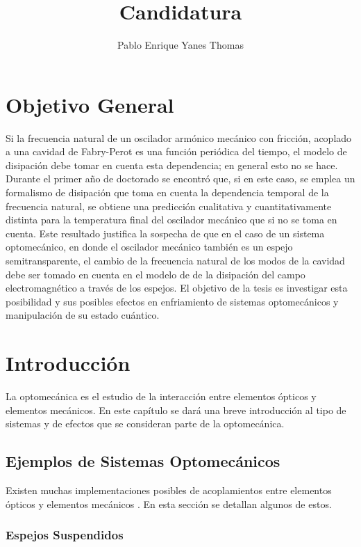 \documentclass[10pt,a4paper]{report}
\author{Pablo Enrique Yanes Thomas}
\title{Candidatura}
\begin{document}
\tableofcontents
\chapter*{Objetivo General}
Si la frecuencia natural de un oscilador armónico mecánico con
fricción, acoplado a una cavidad de Fabry-Perot  es una
función periódica del tiempo, el modelo de disipación
 debe tomar en cuenta esta dependencia; en
general esto no se hace. Durante el primer año de doctorado se
encontró que, si en este caso, se emplea un formalismo de disipación
que toma en cuenta la dependencia temporal de la frecuencia natural,
se obtiene una predicción cualitativa y cuantitativamente distinta
para la temperatura final del oscilador mecánico que si no se toma en
cuenta. Este resultado justifica la sospecha de que en el caso de un
sistema optomecánico, en donde el oscilador mecánico también es un
espejo semitransparente, el cambio de la frecuencia natural de los
modos de la cavidad debe ser tomado en cuenta en el modelo de
de la disipación del campo electromagnético a través
de los espejos. El objetivo de la tesis es investigar esta posibilidad
y sus posibles efectos en enfriamiento de sistemas optomecánicos y
manipulación de su estado cuántico.


\chapter{Introducción}

La optomecánica es el estudio de la interacción entre elementos ópticos y elementos mecánicos. En este capítulo se dará una breve introducción al tipo de sistemas y de efectos que se consideran parte de la optomecánica. 


\section{Ejemplos de Sistemas Optomecánicos}

Existen muchas implementaciones posibles de acoplamientos entre elementos ópticos y elementos mecánicos \cite{KippenberCO}. En esta sección se detallan algunos de estos.

\subsection{Espejos Suspendidos}
\end{document}
